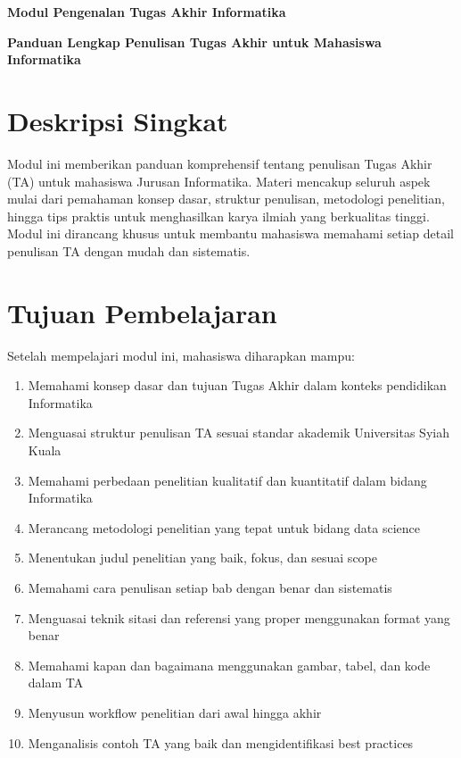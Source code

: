 \begin{center}
    \textbf{Modul Pengenalan Tugas Akhir Informatika}

    \textbf{Panduan Lengkap Penulisan Tugas Akhir untuk Mahasiswa Informatika}
\end{center}

\section*{Deskripsi Singkat}
Modul ini memberikan panduan komprehensif tentang penulisan Tugas Akhir (TA) untuk mahasiswa Jurusan Informatika. Materi mencakup seluruh aspek mulai dari pemahaman konsep dasar, struktur penulisan, metodologi penelitian, hingga tips praktis untuk menghasilkan karya ilmiah yang berkualitas tinggi. Modul ini dirancang khusus untuk membantu mahasiswa memahami setiap detail penulisan TA dengan mudah dan sistematis.

\section*{Tujuan Pembelajaran}
Setelah mempelajari modul ini, mahasiswa diharapkan mampu:
\begin{enumerate}
    \item Memahami konsep dasar dan tujuan Tugas Akhir dalam konteks pendidikan Informatika
    \item Menguasai struktur penulisan TA sesuai standar akademik Universitas Syiah Kuala
    \item Memahami perbedaan penelitian kualitatif dan kuantitatif dalam bidang Informatika
    \item Merancang metodologi penelitian yang tepat untuk bidang data science
    \item Menentukan judul penelitian yang baik, fokus, dan sesuai scope
    \item Memahami cara penulisan setiap bab dengan benar dan sistematis
    \item Menguasai teknik sitasi dan referensi yang proper menggunakan format yang benar
    \item Memahami kapan dan bagaimana menggunakan gambar, tabel, dan kode dalam TA
    \item Menyusun workflow penelitian dari awal hingga akhir
    \item Menganalisis contoh TA yang baik dan mengidentifikasi best practices
\end{enumerate}

